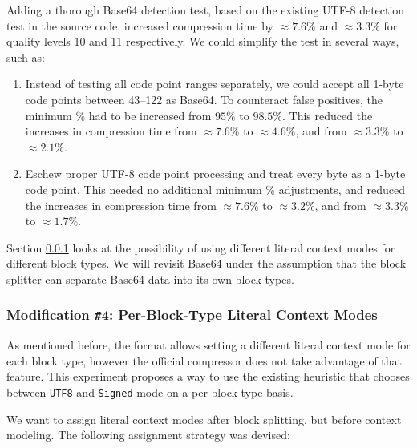 \documentclass[english,master,dept460,male,cpp,cpdeclaration]{diploma}
\newcommand{\nosep}{\itemsep0em}
\begin{document}
			\noindent
			Adding a thorough Base64 detection test, based on the existing UTF-8 detection test in the source code, increased compression time by $\approx 7.6 \%$ and $\approx 3.3 \%$ for quality levels 10 and 11 respectively. We could simplify the test in several ways, such as:
			
			\begin{enumerate} \nosep
				\item Instead of testing all code point ranges separately, we could accept all 1-byte code points between 43--122 as Base64. To counteract false positives, the minimum \% had to be increased from $95 \%$ to $98.5 \%$. This reduced the increases in compression time from $\approx 7.6 \%$ to $\approx 4.6 \%$, and from $\approx 3.3 \%$ to $\approx 2.1 \%$.
				\item Eschew proper UTF-8 code point processing and treat every byte as a 1-byte code point. This needed no additional minimum \% adjustments, and reduced the increases in compression time from $\approx 7.6 \%$ to $\approx 3.2 \%$, and from $\approx 3.3 \%$ to $\approx 1.7 \%$.
			\end{enumerate}
			
			\noindent
			Section \ref{sec:multi-lcm} looks at the possibility of using different literal context modes for different block types. We will revisit Base64 under the assumption that the block splitter can separate Base64 data into its own block types.
		
		\subsubsection{Modification \texttt{\#}4: Per-Block-Type Literal Context Modes}
		\label{sec:multi-lcm}
		
		As mentioned before, the format allows setting a different literal context mode for each block type, however the official compressor does not take advantage of that feature. This experiment proposes a way to use the existing heuristic that chooses between \verb|UTF8| and \verb|Signed| mode on a per block type basis.
		
		We want to assign literal context modes after block splitting, but before context modeling. The following assignment strategy was devised:
		
\end{document}
